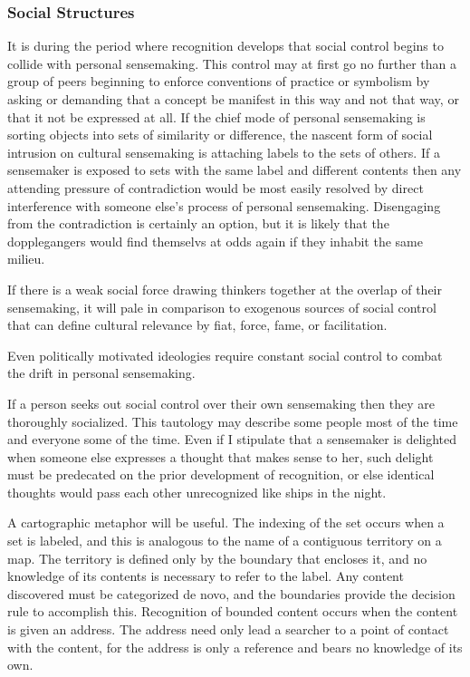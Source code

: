 \subsubsection{Social Structures}\label{social-structures}

It is during the period where recognition develops that social control
begins to collide with personal sensemaking. This control may at first
go no further than a group of peers beginning to enforce conventions of
practice or symbolism by asking or demanding that a concept be manifest
in this way and not that way, or that it not be expressed at all. If the
chief mode of personal sensemaking is sorting objects into sets of
similarity or difference, the nascent form of social intrusion on
cultural sensemaking is attaching labels to the sets of others. If a
sensemaker is exposed to sets with the same label and different contents
then any attending pressure of contradiction would be most easily
resolved by direct interference with someone else's process of personal
sensemaking. Disengaging from the contradiction is certainly an option,
but it is likely that the dopplegangers would find themselvs at odds
again if they inhabit the same milieu.

If there is a weak social force drawing thinkers together at the overlap
of their sensemaking, it will pale in comparison to exogenous sources of
social control that can define cultural relevance by fiat, force, fame,
or facilitation.

Even politically motivated ideologies require constant social control to
combat the drift in personal sensemaking.

If a person seeks out social control over their own sensemaking then
they are thoroughly socialized. This tautology may describe some people
most of the time and everyone some of the time. Even if I stipulate that
a sensemaker is delighted when someone else expresses a thought that
makes sense to her, such delight must be predecated on the prior
development of recognition, or else identical thoughts would pass each
other unrecognized like ships in the night.

A cartographic metaphor will be useful. The indexing of the set occurs
when a set is labeled, and this is analogous to the name of a contiguous
territory on a map. The territory is defined only by the boundary that
encloses it, and no knowledge of its contents is necessary to refer to
the label. Any content discovered must be categorized de novo, and the
boundaries provide the decision rule to accomplish this. Recognition of
bounded content occurs when the content is given an address. The address
need only lead a searcher to a point of contact with the content, for
the address is only a reference and bears no knowledge of its own.

